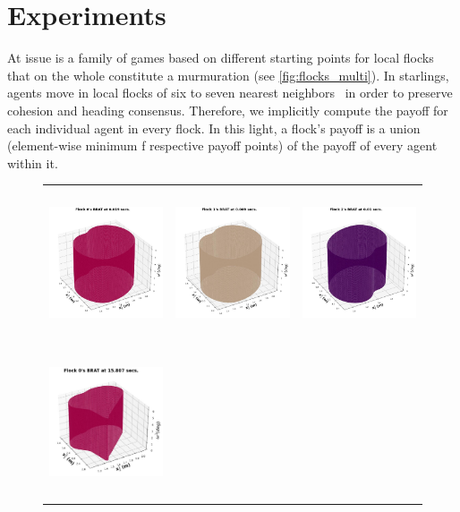 \section{Experiments}
\label{sec:expts}
%
At issue is a family of games based on different starting points for local flocks that on the whole constitute a murmuration (see \autoref{fig:flocks_multi}). 
In starlings, agents move in local flocks of six to seven nearest neighbors~\cite{Ballerini1232} in order to preserve cohesion and heading consensus.  Therefore, we implicitly compute the payoff for each individual agent in every flock. In this light, a flock's payoff is a union (element-wise minimum f respective payoff points) of the payoff of every agent within it. 
%
\begin{figure}[tb!]
	\centering
	\begin{tabular}{ccc} 
		\includegraphics[height=12em,width=10em]{figures/flock_0_init.jpg} 
		&
		\includegraphics[height=12em,width=10em]{figures/flock_1_init.jpg} 
		& 		
		\includegraphics[height=12em,width=10em]{figures/flock_2_init.jpg} 
		\\
		\includegraphics[height=12em,width=10em]{figures/flock_0_final.jpg} 

\end{tabular}
\end{figure}
